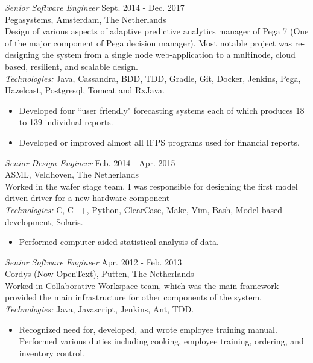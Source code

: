 \documentclass[margin]{res}
\begin{document}
\begin{resume}
 		{\sl Senior Software Engineer} \hfill Sept. 2014 - Dec. 2017 \\
		Pegasystems, Amsterdam, The Netherlands \\
		Design of various aspects of adaptive predictive analytics manager of Pega 7 (One of the major component of Pega decision manager). 
		Most notable project was re- designing the system from a single node web-application to a multinode, cloud based, resilient, and scalable design. \\
		\emph{Technologies:} Java, Cassandra, BDD, TDD, Gradle, Git, Docker, Jenkins, Pega, Hazelcast, Postgresql, Tomcat and RxJava.
                 \begin{itemize}  \itemsep -2pt %
                 \item Developed four ``user friendly" forecasting 
                    systems each of which produces 18 to 139 
                    individual reports. 
                \item   Developed or improved almost all IFPS 
                    programs used for financial reports. 
                \end{itemize}
 
                {\sl Senior Design Engineer} \hfill          Feb. 2014 - Apr. 2015 \\
		ASML, Veldhoven, The Netherlands \\
		Worked in the wafer stage team. I was responsible for designing the first model driven driver for a new hardware component \\
		\emph{Technologies:} C, C++, Python, ClearCase, Make, Vim, Bash, Model-based development, Solaris.
                 \begin{itemize}  \itemsep -2pt %
                 \item Performed computer aided statistical analysis 
                    of data. 
                 \end{itemize} 

                {\sl Senior Software Engineer} \hfill        Apr. 2012 - Feb. 2013 \\
		Cordys (Now OpenText), Putten, The Netherlands \\
		Worked in Collaborative Workspace team, which was the main framework provided the main infrastructure for other components of the system. \\
		\emph{Technologies:} Java, Javascript, Jenkins, Ant, TDD.
                  \begin{itemize}
                   \item Recognized need for, developed, and wrote 
                    employee training manual. Performed various 
                    duties including cooking, employee training, 
                    ordering, and inventory control. 
                   \end{itemize} 


\end{resume}
\end{document}
